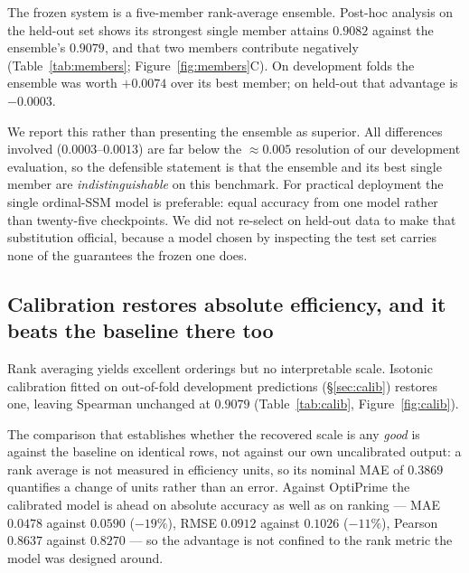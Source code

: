 \documentclass[11pt]{article}
\begin{document}
The frozen system is a five-member rank-average ensemble. Post-hoc analysis on the
held-out set shows its strongest single member attains $0.9082$ against the ensemble's
$0.9079$, and that two members contribute negatively (Table~\ref{tab:members}; Figure~\ref{fig:members}C).
On development folds the ensemble was worth $+0.0074$ over its best member; on held-out
that advantage is $-0.0003$.

We report this rather than presenting the ensemble as superior. All differences
involved ($0.0003$--$0.0013$) are far below the $\approx0.005$ resolution of our
development evaluation, so the defensible statement is that the ensemble and its best
single member are \emph{indistinguishable} on this benchmark. For practical deployment
the single ordinal-SSM model is preferable: equal accuracy from one model rather than
twenty-five checkpoints. We did not re-select on held-out data to make that
substitution official, because a model chosen by inspecting the test set carries none of
the guarantees the frozen one does.

\subsection{Calibration restores absolute efficiency, and it beats the baseline there too}
\label{sec:calib-results}

Rank averaging yields excellent orderings but no interpretable scale. Isotonic
calibration fitted on out-of-fold development predictions (\S\ref{sec:calib}) restores
one, leaving Spearman unchanged at $0.9079$ (Table~\ref{tab:calib},
Figure~\ref{fig:calib}).

The comparison that establishes whether the recovered scale is any \emph{good} is
against the baseline on identical rows, not against our own uncalibrated output: a rank
average is not measured in efficiency units, so its nominal MAE of $0.3869$ quantifies
a change of units rather than an error. Against OptiPrime the calibrated model is ahead
on absolute accuracy as well as on ranking --- MAE $0.0478$ against $0.0590$
($-19\%$), RMSE $0.0912$ against $0.1026$ ($-11\%$), Pearson $0.8637$ against $0.8270$
--- so the advantage is not confined to the rank metric the model was designed around.
\end{document}
